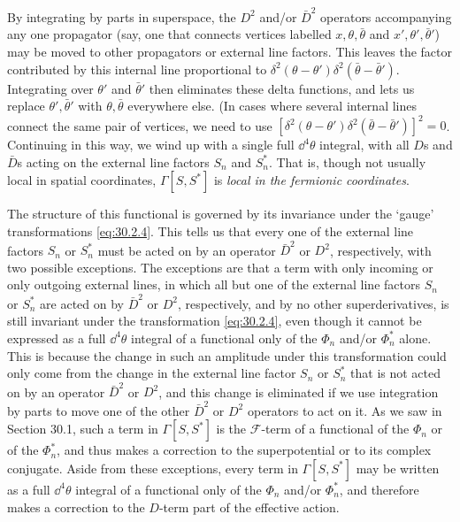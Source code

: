 By integrating by parts in superspace, the \(D^2\) and/or
\(\bar D^2\) operators accompanying any one propagator (say, one that
connects vertices labelled \(x,\theta,\bar\theta\) and
\(x',\theta',\bar\theta'\)) may be moved to
other propagators or external line factors. This leaves the factor contributed
by this internal line proportional to
\(\delta^2(\theta-\theta')\delta^2(\bar\theta-\bar\theta')\).
Integrating over \(\theta'\) and \(\bar\theta'\) then eliminates these delta
functions, and lets us replace \(\theta',\bar\theta'\) with
\(\theta,\bar\theta\) everywhere else. (In cases where several internal
lines connect the same pair of vertices, we need to use
\(\left[
  \delta^2(\theta-\theta')
  \delta^2(\bar\theta-\bar\theta')
\right]^2=0\).
Continuing in this way, we wind up with a
single full \(\dd^4\theta\) integral, with all \(D\)s and \(\bar D\)s acting
on the external line factors \(S_n\) and \(S_n^*\). That is, though
not usually local in spatial coordinates, \(\Gamma[S,S^*]\) is
\emph{local in the fermionic coordinates}.

The structure of this functional is governed by its invariance under the
`gauge' transformations \eqref{eq:30.2.4}. This tells us that every one of
the external line factors \(S_n\) or \(S_n^*\) must be acted on by
an operator \(\bar D^2\) or \(D^2\), respectively, with two possible
exceptions. The exceptions are that a term with only incoming or only outgoing
external lines, in which all but one of the external line factors \(S_n\)
or \(S_n^*\) are acted on by \(\bar D^2\) or \(D^2\), respectively,
and by no other superderivatives, is still invariant under the transformation
\eqref{eq:30.2.4}, even though it cannot be expressed as a full
\(\dd^4\theta\) integral of a functional only of the \(\Phi_n\) and/or
\(\Phi_n^*\) alone. This is because the change in such an amplitude under this
transformation could only come from the change in the external line factor
\(S_n\) or \(S_n^*\) that is not acted on by an operator \(\bar D^2\)
or \(D^2\), and this change is eliminated if we use integration by parts
to move one of the other \(\bar D^2\) or \(D^2\) operators to act
on it. As we saw in Section 30.1, such a term in
\(\Gamma[S,S^*]\) is the
\(\mathcal{F}\)-term of a functional of the \(\Phi_n\) or of the
\(\Phi_n^*\), and thus makes a correction to the superpotential or to its
complex conjugate. Aside from these exceptions, every term in
\(\Gamma[S,S^*]\) may be written as a full \(\dd^4\theta\) integral
of a functional only of the \(\Phi_n\) and/or \(\Phi_n^*\), and therefore
makes a correction to the \(D\)-term part of the effective action.

